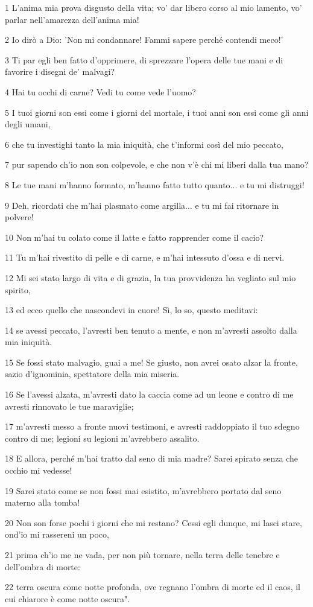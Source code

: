 \par 1 L'anima mia prova disgusto della vita; vo' dar libero corso al mio lamento, vo' parlar nell'amarezza dell'anima mia!
\par 2 Io dirò a Dio: 'Non mi condannare! Fammi sapere perché contendi meco!'
\par 3 Ti par egli ben fatto d'opprimere, di sprezzare l'opera delle tue mani e di favorire i disegni de' malvagi?
\par 4 Hai tu occhi di carne? Vedi tu come vede l'uomo?
\par 5 I tuoi giorni son essi come i giorni del mortale, i tuoi anni son essi come gli anni degli umani,
\par 6 che tu investighi tanto la mia iniquità, che t'informi così del mio peccato,
\par 7 pur sapendo ch'io non son colpevole, e che non v'è chi mi liberi dalla tua mano?
\par 8 Le tue mani m'hanno formato, m'hanno fatto tutto quanto... e tu mi distruggi!
\par 9 Deh, ricordati che m'hai plasmato come argilla... e tu mi fai ritornare in polvere!
\par 10 Non m'hai tu colato come il latte e fatto rapprender come il cacio?
\par 11 Tu m'hai rivestito di pelle e di carne, e m'hai intessuto d'ossa e di nervi.
\par 12 Mi sei stato largo di vita e di grazia, la tua provvidenza ha vegliato sul mio spirito,
\par 13 ed ecco quello che nascondevi in cuore! Sì, lo so, questo meditavi:
\par 14 se avessi peccato, l'avresti ben tenuto a mente, e non m'avresti assolto dalla mia iniquità.
\par 15 Se fossi stato malvagio, guai a me! Se giusto, non avrei osato alzar la fronte, sazio d'ignominia, spettatore della mia miseria.
\par 16 Se l'avessi alzata, m'avresti dato la caccia come ad un leone e contro di me avresti rinnovato le tue maraviglie;
\par 17 m'avresti messo a fronte nuovi testimoni, e avresti raddoppiato il tuo sdegno contro di me; legioni su legioni m'avrebbero assalito.
\par 18 E allora, perché m'hai tratto dal seno di mia madre? Sarei spirato senza che occhio mi vedesse!
\par 19 Sarei stato come se non fossi mai esistito, m'avrebbero portato dal seno materno alla tomba!
\par 20 Non son forse pochi i giorni che mi restano? Cessi egli dunque, mi lasci stare, ond'io mi rassereni un poco,
\par 21 prima ch'io me ne vada, per non più tornare, nella terra delle tenebre e dell'ombra di morte:
\par 22 terra oscura come notte profonda, ove regnano l'ombra di morte ed il caos, il cui chiarore è come notte oscura".

